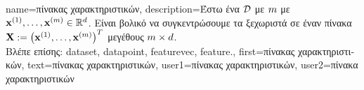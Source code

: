 {name={\foreignlanguage{greek}{πίνακας χαρακτηριστικών}}, 
	description={\foreignlanguage{greek}{Έστω ένα}  $\mathcal{D}$ 
		\foreignlanguage{greek}{με} $m$  \foreignlanguage{greek}{με}  
		${\bf x}^{(1)},\ldots,{\bf x}^{(m)} \in \mathbb{R}^{d}$. 
		\foreignlanguage{greek}{Είναι βολικό να συγκεντρώσουμε τα ξεχωριστά}  
		 \foreignlanguage{greek}{σε έναν πίνακα}  
		${\bf X} := \big({\bf x}^{(1)},\ldots,{\bf x}^{(m)}\big)^{T}$ 
		\foreignlanguage{greek}{μεγέθους} $m \times d$.\\
		\foreignlanguage{greek}{Βλέπε επίσης:} \gls{dataset}, \gls{datapoint}, \gls{featurevec}, \gls{feature}.},
	first={\foreignlanguage{greek}{πίνακας χαρακτηριστικών}},
	text={\foreignlanguage{greek}{πίνακας χαρακτηριστικών}},
	user1={\foreignlanguage{greek}{πίνακας χαρακτηριστικών}}, %
  	user2={\foreignlanguage{greek}{πίνακα χαρακτηριστικών}} %
}

